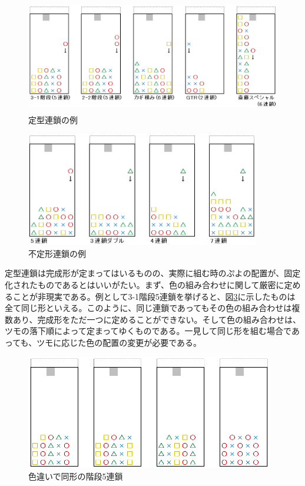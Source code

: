 \documentclass[12pt]{jarticle}
\begin{document}
\begin{figure}[hbt]
  \begin{center}
  \includegraphics[height=5cm]{img/teikei.png}
  \caption{定型連鎖の例} \label{fig:teikei}
\end{center}
\end{figure}

\begin{figure}[hbt]
  \begin{center}
  \includegraphics[height=5cm]{img/huteikei.png}
  \caption{不定形連鎖の例} \label{fig:huteikei}
\end{center}
\end{figure}

定型連鎖は完成形が定まってはいるものの、実際に組む時のぷよの配置が、固定化されたものであるとはいいがたい。まず、色の組み合わせに関して厳密に定めることが非現実である。例として3-1階段5連鎖を挙げると、図\ref{fig:kaidan5}に示したものは全て同じ形といえる。このように、同じ連鎖であってもその色の組み合わせは複数あり、完成形をただ一つに定めることができない。そして色の組み合わせは、ツモの落下順によって定まってゆくものである。一見して同じ形を組む場合であっても、ツモに応じた色の配置の変更が必要である。

\begin{figure}[hbt]
  \begin{center}
  \includegraphics[height=5cm]{img/kaidan5.png}
  \caption{色違いで同形の階段5連鎖} \label{fig:kaidan5}
\end{center}
\end{figure}
\end{document}
